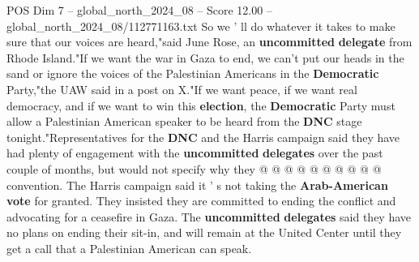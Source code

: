 \begin{textsample}{POS Dim 7 – global\_north\_2024\_08 – Score 12.00 – global\_north\_2024\_08/112771163.txt}
So we ' ll do whatever it takes to make sure that our voices are heard,"said June Rose, an \textbf{uncommitted} \textbf{delegate} from Rhode Island."If we want the war in Gaza to end, we can't put our heads in the sand or ignore the voices of the Palestinian Americans in the \textbf{Democratic} Party,"the UAW said in a post on X."If we want peace, if we want real democracy, and if we want to win this \textbf{election}, the \textbf{Democratic} Party must allow a Palestinian American speaker to be heard from the \textbf{DNC} stage tonight."Representatives for the \textbf{DNC} and the Harris campaign said they have had plenty of engagement with the \textbf{uncommitted} \textbf{delegates} over the past couple of months, but would not specify why they @ @ @ @ @ @ @ @ @ @ convention.
The Harris campaign said it ' s not taking the \textbf{Arab-American} \textbf{vote} for granted.
They insisted they are committed to ending the conflict and advocating for a ceasefire in Gaza.
The \textbf{uncommitted} \textbf{delegates} said they have no plans on ending their sit-in, and will remain at the United Center until they get a call that a Palestinian American can speak.

\end{textsample}
